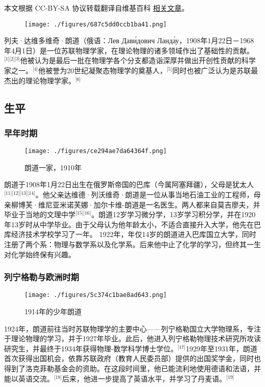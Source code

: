 
本文根据 CC-BY-SA 协议转载翻译自维基百科 \href{https://en.wikipedia.org/wiki/Lev_Landau}{相关文章}。

\begin{figure}[ht]
\centering
\texttt{[image: ./figures/687c5dd0ccb1ba41.png]}
\caption{} \label{fig_LFLD_8}
\end{figure}
列夫·达维多维奇·朗道（俄语：Лев Дави́дович Ланда́у，1908年1月22日－1968年4月1日）是一位苏联物理学家，在理论物理的诸多领域作出了基础性的贡献。\(^\text{[1][2][3]}\)他被认为是最后一批在物理学各个分支都造诣深厚并做出开创性贡献的科学家之一。\(^\text{[4]}\)他被誉为20世纪凝聚态物理学的奠基人，\(^\text{[5]}\)同时也被广泛认为是苏联最杰出的理论物理学家。\(^\text{[6]}\)
\subsection{生平}
\subsubsection{早年时期}
\begin{figure}[ht]
\centering
\texttt{[image: ./figures/ce294ae7da64364f.png]}
\caption{朗道一家，1910年} \label{fig_LFLD_1}
\end{figure}
朗道于1908年1月22日出生在俄罗斯帝国的巴库（今属阿塞拜疆），父母是犹太人\(^\text{[11][12][13][14]}\)。他父亲达维德·列沃维奇·朗道是一位从事当地石油工业的工程师，母亲柳博芙·维尼亚米诺芙娜·加尔卡维-朗道是一名医生。两人都来自莫吉廖夫，并毕业于当地的文理中学\(^\text{[15][16]}\)。朗道12岁学习微分学，13岁学习积分学，并在1920年13岁时从中学毕业。由于父母认为他年龄太小，不适合直接升入大学，他先在巴库经济技术学校学习了一年。
1922年，年仅14岁的朗道进入巴库国立大学，同时注册了两个系：物理与数学系以及化学系。后来他中止了化学的学习，但终其一生对化学始终保有兴趣。
\subsubsection{列宁格勒与欧洲时期}
\begin{figure}[ht]
\centering
\texttt{[image: ./figures/5c374c1bae8ad643.png]}
\caption{1914年的少年朗道} \label{fig_LFLD_2}
\end{figure}
1924年，朗道前往当时苏联物理学的主要中心——列宁格勒国立大学物理系，专注于理论物理的学习，并于1927年毕业。此后，他进入列宁格勒物理技术研究所攻读研究生，并最终于1934年获得物理-数学科学博士学位。\(^\text{[17]}\)1929年至1931年，朗道首次获得出国机会，依靠苏联政府（教育人民委员部）提供的出国奖学金，同时也得到了洛克菲勒基金会的资助。在这段时间里，他已能流利地使用德语和法语，并能以英语交流。\(^\text{[18]}\)后来，他进一步提高了英语水平，并学习了丹麦语。\(^\text{[19]}\)

